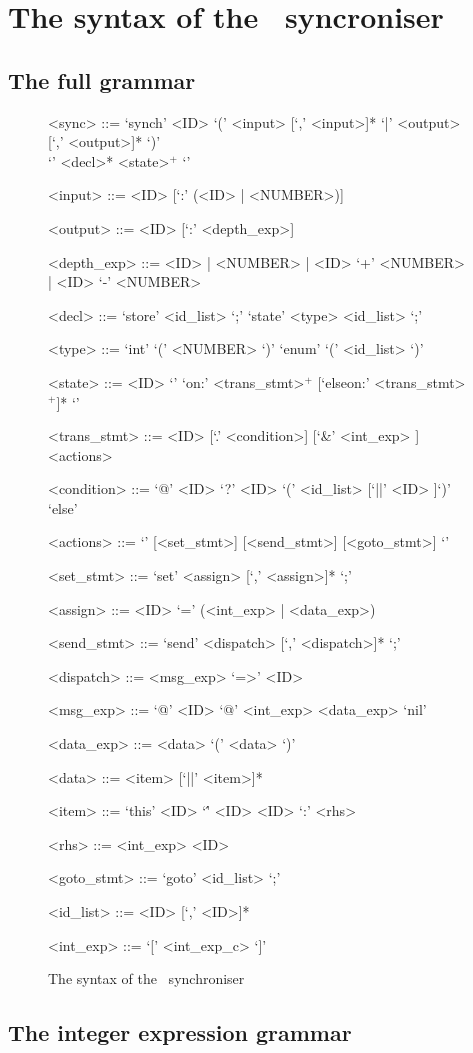 \chapter{The syntax of the \ak\ syncroniser}

  \section{The full grammar\label{sync_syntax}}
\setlength{\grammarindent}{8em} %
\begin{figure}[h!]
\scriptsize
\begin{grammar}
<sync> ::= `synch' <ID> `(' <input> [`,' <input>]* `|' <output> [`,' <output>]* `)' \\
           `{' <decl>* <state>$^+$ `}'

<input>  ::= <ID> [`:' (<ID> | <NUMBER>)]

<output>  ::= <ID> [`:' <depth\_exp>]

<depth\_exp> ::= <ID> | <NUMBER> | <ID> `+' <NUMBER> | <ID> `-' <NUMBER>

<decl> ::= `store' <id\_list> `;'
        \alt `state' <type> <id\_list> `;'

<type> ::= `int' `(' <NUMBER> `)'
                  \alt `enum' `(' <id_list> `)'

<state> ::= <ID> `{' `on:' <trans\_stmt>$^+$ [`elseon:' <trans\_stmt>$^+$]* `}'

<trans\_stmt> ::= <ID> [`.' <condition>] [`&' <int\_exp> ] <actions>

<condition> ::= `@' <ID>
             \alt `?' <ID>
             \alt [`?' <ID>] `(' <id_list> [`||' <ID> ]`)'
             \alt `else'

<actions> ::= `{' [<set\_stmt>] [<send\_stmt>] [<goto\_stmt>] `}'

<set\_stmt> ::= `set' <assign> [`,' <assign>]* `;'

<assign> ::= <ID> `=' (<int\_exp> | <data\_exp>)

<send\_stmt> ::= `send' <dispatch> [`,' <dispatch>]*  `;'

<dispatch> ::= <msg\_exp> `=>' <ID>

<msg\_exp> ::= `@' <ID>
           \alt `@' <int\_exp>
           \alt [`?' <ID>] <data\_exp>
           \alt `nil'

<data\_exp> ::= <data>
             \alt `(' <data> `)'

<data> ::= <item> [`||' <item>]*

<item> ::= `this'
        \alt <ID>
        \alt `\'' <ID>
        \alt <ID> `:' <rhs>

<rhs> ::= <int\_exp>
          \alt <ID>

<goto\_stmt> ::= `goto' <id\_list> `;'

<id\_list> ::= <ID> [`,' <ID>]*

<int\_exp> ::= `[' <int_exp_c> `]'
\end{grammar}
\caption{The syntax of the \ak\ synchroniser}
\end{figure}


  \section{The integer expression grammar\label{int_exp_gr}}
